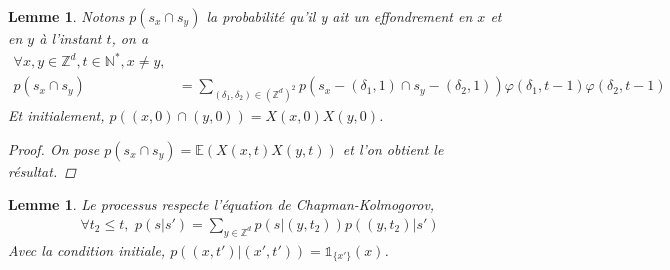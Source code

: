 \documentclass{article}
\newtheorem{lemma}[theorem]{Lemme}
\theoremstyle{definition}
\begin{document}
\begin{lemma}
	Notons $p(s_x\cap s_y)$ la probabilité qu'il y ait un effondrement en $x$ et en $y$ à l'instant $t$, on a
\begin{align*}
	\forall x, y\in \mathbb{Z}^d, t\in\mathbb{N}^*, x\neq y, \\p(s_x \cap s_y) &= \sum_{(\delta_1,\delta_2)\in (\mathbb{Z}^d)^2} p(s_x-(\delta_1, 1) \cap s_y-(\delta_2,1))\varphi(\delta_1,t-1)\varphi(\delta_2,t-1)\label{1}\tag{1}
\end{align*} 
Et initialement, $p((x,0)\cap (y,0)) = X(x,0)X(y,0)$. \begin{proof}
	On pose $p(s_x\cap s_y) = \mathbb{E}(X(x,t)X(y,t))$ et l'on obtient le résultat.
\end{proof}
\end{lemma}

\begin{lemma}
	Le processus respecte l'équation de Chapman-Kolmogorov, 
\begin{align*}
\forall t_2\leq t, \,\,p(s|s') = \sum_{y\in\mathbb{Z}^d}p(s|(y,t_2))p((y,t_2)|s')\end{align*}
Avec la condition initiale, $p((x,t')|(x',t')) = \mathds{1}_{\{x'\}}(x)$.
\end{lemma}
\end{document}
